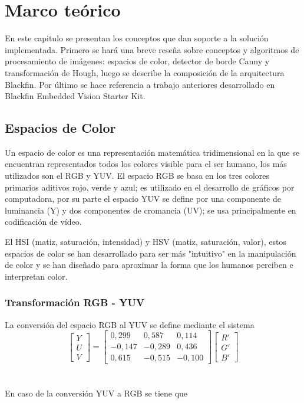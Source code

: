 \chapter{Marco teórico}

\label{ch:marco}

En este capitulo se presentan los conceptos que dan soporte a la solución implementada. Primero se hará una breve reseña sobre conceptos y algoritmos de procesamiento de imágenes: espacios de color, detector de borde Canny y transformación de Hough, luego se describe la composición de la arquitectura Blackfin. Por último se hace referencia a trabajo anteriores desarrollado en Blackfin Embedded Vision Starter Kit.  

\section{Espacios de Color}

Un espacio de color es una representación matemática tridimensional en la que se encuentran representados todos los colores visible para el ser humano, los más utilizados son el RGB y YUV. El espacio RGB se basa en los tres colores primarios aditivos rojo, verde y azul; es utilizado en el desarrollo de gráficos por computadora, por su parte el espacio YUV se define por una componente de luminancia (Y) y dos componentes de cromancia (UV); se usa principalmente en codificación de vídeo.  

El HSI (matiz, saturación, intensidad) y HSV (matiz, saturación, valor), estos espacios de color se han desarrollado para ser más "intuitivo" en la manipulación de color y se han diseñado para aproximar la forma que los humanos perciben e interpretan color. 

\subsection{Transformación RGB - YUV}

La conversión del espacio RGB al YUV se define mediante el sistema
\begin{equation}
\begin{bmatrix}
Y \\ 
U \\ 
V
\end{bmatrix} =
\begin{bmatrix}
0,299 & 0,587 & 0,114 \\ 
-0,147 & -0,289 & 0,436 \\ 
0,615 & - 0,515 & - 0,100
\end{bmatrix}
\begin{bmatrix}
R' \\ 
G' \\ 
B'
\end{bmatrix}  
\end{equation}
\\
\\
En caso de la conversión YUV a RGB se tiene que 

